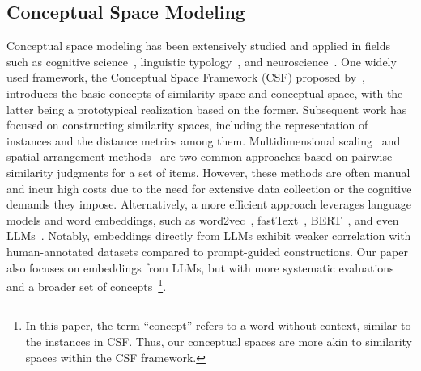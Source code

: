 \subsection{Conceptual Space Modeling}
Conceptual space modeling has been extensively studied and applied in fields such as cognitive science~\cite{gardenfors2000conceptual,gardenfors2014geometry,nosofsky1986attention,nosofsky1992similarity}, linguistic typology~\cite{croft2001radical,haspelmath2003geometry}, and neuroscience~\cite{caglar2021conceptual}. One widely used framework, the Conceptual Space Framework (CSF) proposed by~\citet{gardenfors2000conceptual,gardenfors2014geometry}, introduces the basic concepts of similarity space and conceptual space, with the latter being a prototypical realization based on the former. Subsequent work has focused on constructing similarity spaces, including the representation of instances and the distance metrics among them. Multidimensional scaling~\cite{BorgGroenen1999} and spatial arrangement methods~\cite{goldstone1994efficient} are two common approaches based on pairwise similarity judgments for a set of items. However, these methods are often manual and incur high costs due to the need for extensive data collection or the cognitive demands they impose. Alternatively, a more efficient approach leverages language models and word embeddings, such as word2vec~\cite{Mikolov2013distributed}, fastText~\cite{Bojanowski2017subword}, BERT~\cite{devlin2019bert}, and even LLMs~\cite{touvron2023llama}. Notably, embeddings directly from LLMs exhibit weaker correlation with human-annotated datasets compared to prompt-guided constructions. Our paper also focuses on embeddings from LLMs, but with more systematic evaluations and a broader set of concepts~\footnote{In this paper, the term ``concept'' refers to a word without context, similar to the instances in CSF. Thus, our conceptual spaces are more akin to similarity spaces within the CSF framework.}.


